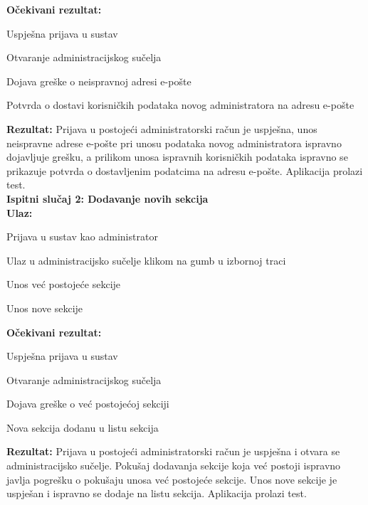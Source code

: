 			 \textbf{Očekivani rezultat:}
			 \begin{packed_item}
			 	\item {Uspješna prijava u sustav}
			 	\item {Otvaranje administracijskog sučelja}
			 	\item {Dojava greške o neispravnoj adresi e-pošte}
			 	\item {Potvrda o dostavi korisničkih podataka novog administratora na adresu e-pošte}
			 \end{packed_item}
			 \textbf{Rezultat: }Prijava u postojeći administratorski račun je uspješna, unos neispravne adrese e-pošte pri unosu podataka novog administratora ispravno dojavljuje grešku, a prilikom unosa ispravnih korisničkih podataka ispravno se prikazuje potvrda o dostavljenim podatcima na adresu e-pošte. Aplikacija prolazi test.\\
			
			 \textbf{Ispitni slučaj 2: Dodavanje novih sekcija}\\
			 \textbf{Ulaz:}
			 \begin{packed_item}
			 	\item {Prijava u sustav kao administrator}
			 	\item {Ulaz u administracijsko sučelje klikom na gumb u izbornoj traci}
			 	\item {Unos već postojeće sekcije}
			 	\item {Unos nove sekcije}
			 \end{packed_item}
			 \textbf{Očekivani rezultat:}
			 \begin{packed_item}
			 	\item {Uspješna prijava u sustav}
			 	\item {Otvaranje administracijskog sučelja}
			 	\item {Dojava greške o već postojećoj sekciji}
			 	\item {Nova sekcija dodanu u listu sekcija}
			 \end{packed_item}
			 \textbf{Rezultat: }Prijava u postojeći administratorski račun je uspješna i otvara se administracijsko sučelje. Pokušaj dodavanja sekcije koja već postoji ispravno javlja pogrešku o pokušaju unosa već postojeće sekcije. Unos nove sekcije je uspješan i ispravno se dodaje na listu sekcija. Aplikacija prolazi test.\\
			
